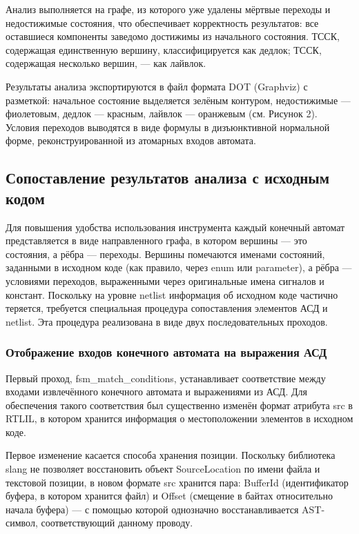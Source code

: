 Анализ выполняется на графе, из которого уже удалены мёртвые переходы и недостижимые состояния,
что обеспечивает корректность результатов: все оставшиеся компоненты заведомо достижимы из
начального состояния. ТССК, содержащая единственную вершину, классифицируется как дедлок;
ТССК, содержащая несколько вершин, --- как лайвлок.

Результаты анализа экспортируются в файл формата DOT (Graphviz) с разметкой: начальное состояние выделяется зелёным контуром, недостижимые — фиолетовым, дедлок — красным, лайвлок — оранжевым (см. Рисунок 2). Условия переходов выводятся в виде формулы в дизъюнктивной нормальной форме, реконструированной из атомарных входов автомата.

\subsection{Сопоставление результатов анализа с исходным кодом}

Для повышения удобства использования инструмента каждый конечный автомат представляется в виде
направленного графа, в котором вершины — это состояния, а рёбра — переходы. Вершины помечаются
именами состояний, заданными в исходном коде (как правило, через enum или parameter), а рёбра ---
условиями переходов, выраженными через оригинальные имена сигналов и констант. Поскольку на уровне
netlist информация об исходном коде частично теряется, требуется специальная процедура сопоставления
элементов АСД и netlist. Эта процедура реализована в виде двух последовательных проходов.

\subsubsection{Отображение входов конечного автомата на выражения АСД}

Первый проход, fsm\_match\_conditions, устанавливает соответствие между входами извлечённого
конечного автомата и выражениями из АСД. Для обеспечения такого соответствия был существенно
изменён формат атрибута src в RTLIL, в котором хранится информация о местоположении элементов
в исходном коде.

Первое изменение касается способа хранения позиции. Поскольку библиотека slang не позволяет
восстановить объект SourceLocation по имени файла и текстовой позиции, в новом формате src
хранится пара: BufferId (идентификатор буфера, в котором хранится файл) и Offset (смещение
в байтах относительно начала буфера) --- с помощью которой однозначно восстанавливается AST-символ,
соответствующий данному проводу.

